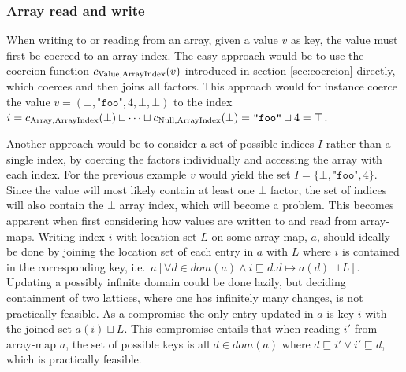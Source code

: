 \subsubsection{Array read and write}
When writing to or reading from an array, given a value $v$ as key, the value must first be coerced to an array index. The easy approach would be to use the coercion function $c_{\text{Value}, \text{ArrayIndex}}(v)$ introduced in section \ref{sec:coercion} directly, which coerces and then joins all factors. This approach would for instance coerce the value $v = (\bot, \texttt{"foo"}, 4, \bot, \bot)$ to the index $i = c_{\text{Array}, \text{ArrayIndex}}(\bot)\sqcup\cdots\sqcup c_{\text{Null}, \text{ArrayIndex}}(\bot) = \texttt{"foo"} \sqcup 4 = \top $. 

Another approach would be to consider a set of possible indices $I$ rather than a single index, by coercing the factors individually and accessing the array with each index. For the previous example $v$ would yield the set $I = \{\bot, \texttt{"foo"}, 4\}$. Since the value will most likely contain at least one $\bot$ factor, the set of indices will also contain the $\bot$ array index, which will become a problem. This becomes apparent when first considering how values are written to and read from array-maps. Writing index $i$ with location set $L$ on some array-map, $a$, should ideally be done by joining the location set of each entry in $a$ with $L$ where $i$ is contained in the corresponding key, i.e.\ $a[\forall d \in dom(a)\wedge i \sqsubseteq d. d \mapsto a(d)\sqcup L]$. Updating a possibly infinite domain could be done lazily, but deciding containment of two lattices, where one has infinitely many changes, is not practically feasible. As a compromise the only entry updated in $a$ is key $i$ with the joined set $a(i)\sqcup L$. This compromise entails that when reading $i'$ from array-map $a$, the set of possible keys is all $d\in dom(a)$ where $d\sqsubseteq i' \vee i'\sqsubseteq d$, which is practically feasible. 

